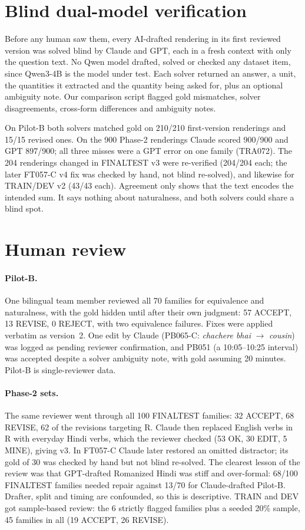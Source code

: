\documentclass[12pt,a4paper,oneside]{report}
\renewcommand{\_}{\oldunderscore\allowbreak}
\begin{document}
\section{Blind dual-model verification}

Before any human saw them, every AI-drafted rendering in its first reviewed version was solved blind by Claude and GPT, each in a fresh context with only the question text. No Qwen model drafted, solved or checked any dataset item, since Qwen3-4B is the model under test. Each solver returned an answer, a unit, the quantities it extracted and the quantity being asked for, plus an optional ambiguity note. Our comparison script flagged gold mismatches, solver disagreements, cross-form differences and ambiguity notes.

On Pilot-B both solvers matched gold on 210/210 first-version renderings and 15/15 revised ones. On the 900 Phase-2 renderings Claude scored 900/900 and GPT 897/900; all three misses were a GPT error on one family (TRA072). The 204 renderings changed in FINAL\_TEST v3 were re-verified (204/204 each; the later FT057-C v4 fix was checked by hand, not blind re-solved), and likewise for TRAIN/DEV v2 (43/43 each). Agreement only shows that the text encodes the intended sum. It says nothing about naturalness, and both solvers could share a blind spot.

\section{Human review}
\label{sec:review}

\paragraph{Pilot-B.} One bilingual team member reviewed all 70 families for equivalence and naturalness, with the gold hidden until after their own judgment: 57 ACCEPT, 13 REVISE, 0 REJECT, with two equivalence failures. Fixes were applied verbatim as version~2. One edit by Claude (PB065-C: \emph{chachere bhai} $\to$ \emph{cousin}) was logged as pending reviewer confirmation, and PB051 (a 10:05--10:25 interval) was accepted despite a solver ambiguity note, with gold assuming 20 minutes. Pilot-B is single-reviewer data.

\paragraph{Phase-2 sets.} The same reviewer went through all 100 FINAL\_TEST families: 32 ACCEPT, 68 REVISE, 62 of the revisions targeting R. Claude then replaced English verbs in R with everyday Hindi verbs, which the reviewer checked (53 OK, 30 EDIT, 5 MINE), giving v3. In FT057-C Claude later restored an omitted distractor; its gold of 30 was checked by hand but not blind re-solved. The clearest lesson of the review was that GPT-drafted Romanized Hindi was stiff and over-formal: 68/100 FINAL\_TEST families needed repair against 13/70 for Claude-drafted Pilot-B. Drafter, split and timing are confounded, so this is descriptive. TRAIN and DEV got sample-based review: the 6 strictly flagged families plus a seeded 20\% sample, 45 families in all (19 ACCEPT, 26 REVISE).
\end{document}
